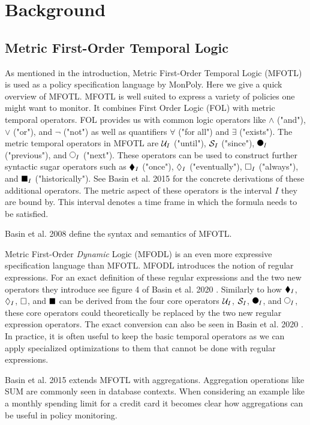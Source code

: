 \section{Background}

\subsection{Metric First-Order Temporal Logic}
As mentioned in the introduction, Metric First-Order Temporal Logic (MFOTL) \cite{Basin2008, Basin2015, Chomicki1995} is used as a policy specification language by MonPoly.
Here we give a quick overview of MFOTL.
MFOTL is well suited to express a variety of policies one might want to monitor.
It combines First Order Logic (FOL) with metric temporal operators.
FOL provides us with common logic operators like $\land$ ("and"), $\lor$ ("or"), and $\neg$ ("not") as well as quantifiers $\forall$ ("for all") and $\exists$ ("exists").
The metric temporal operators in MFOTL are $\mathcal{U}_I$ ("until"), $\mathcal{S}_I$ ("since"), $\Previous_I$ ("previous"), and $\Next_I$ ("next").
These operators can be used to construct further syntactic sugar operators such as $\blacklozenge_I$ ("once"), $\lozenge_I$ ("eventually"), $\square_I$ ("always"), and $\blacksquare_I$ ("historically").
See Basin et al. 2015 \cite{Basin2015} for the concrete derivations of these additional operators.
The metric aspect of these operators is the interval $I$ they are bound by.
This interval denotes a time frame in which the formula needs to be satisfied.

Basin et al. 2008 \cite{Basin2008} define the syntax and semantics of MFOTL.


Metric First-Order \textit{Dynamic} Logic (MFODL) \cite{Basin2020} is an even more expressive specification language than MFOTL.
MFODL introduces the notion of regular expressions.
For an exact definition of these regular expressions and the two new operators they introduce see figure 4 of Basin et al. 2020 \cite{Basin2020}.
Similarly to how $\blacklozenge_I$, $\lozenge_I$, $\square$, and $\blacksquare$ can be derived from the four core operators $\mathcal{U}_I$, $\mathcal{S}_I$, $\Previous_I$, and $\Next_I$, these core operators could theoretically be replaced by the two new regular expression operators.
The exact conversion can also be seen in Basin et al. 2020 \cite{Basin2020}.
In practice, it is often useful to keep the basic temporal operators as we can apply specialized optimizations to them that cannot be done with regular expressions.

Basin et al. 2015 \cite{Basin2015aggregations} extends MFOTL with aggregations.
Aggregation operations like SUM are commonly seen in database contexts.
When considering an example like a monthly spending limit for a credit card it becomes clear how aggregations can be useful in policy monitoring.


